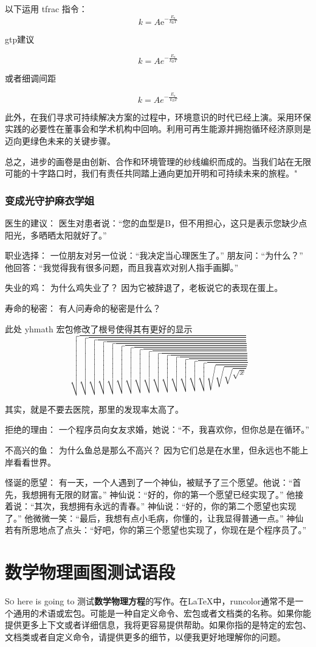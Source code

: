 \documentclass[12pt,a4paper]{article}
\begin{document}
		以下运用 tfrac 指令：
		$$
		k = A\mathrm{e}^{-\tfrac{E_a}{k_\mathrm{B}T}}
		$$
		
		gtp建议
		
		\[ k = A e^{-\frac{\scriptstyle E_a}{\scriptstyle k_B T}} \]
		
		
		或者细调间距
		
		\[ k = A e^{-\frac{\scriptstyle E_a}{\scriptstyle\, k_B T}} \]
		
		此外，在我们寻求可持续解决方案的过程中，环境意识的时代已经上演。采用环保实践的必要性在董事会和学术机构中回响。利用可再生能源并拥抱循环经济原则是迈向更绿色未来的关键步骤。
		
		总之，进步的画卷是由创新、合作和环境管理的纱线编织而成的。当我们站在无限可能的十字路口时，我们有责任共同踏上通向更加开明和可持续未来的旅程。"
	\subsubsection{变成光守护麻衣学姐}
	医生的建议：
	医生对患者说：“您的血型是B，但不用担心，这只是表示您缺少点阳光，多晒晒太阳就好了。”
	
	职业选择：
	一位朋友对另一位说：“我决定当心理医生了。”
	朋友问：“为什么？”
	他回答：“我觉得我有很多问题，而且我喜欢对别人指手画脚。”
	
	失业的鸡：
	为什么鸡失业了？
	因为它被辞退了，老板说它的表现在蛋上。
	
	寿命的秘密：
	有人问寿命的秘密是什么？
	
	此处 yhmath 宏包修改了根号使得其有更好的显示
	$$
	\sqrt{\sqrt{\sqrt{\sqrt{\sqrt{\sqrt{\sqrt{\sqrt{\sqrt{\sqrt{\sqrt{\sqrt{\sqrt{\sqrt{\sqrt{\sqrt{\sqrt{\sqrt{\sqrt{x}}}}}}}}}}}}}}}}}}}
	$$
	
	
	其实，就是不要去医院，那里的发现率太高了。
	
	拒绝的理由：
	一个程序员向女友求婚，她说：“不，我喜欢你，但你总是在循环。”
	
	不高兴的鱼：
	为什么鱼总是那么不高兴？
	因为它们总是在水里，但永远也不能上岸看看世界。
	
	怪诞的愿望：
	有一天，一个人遇到了一个神仙，被赋予了三个愿望。他说：“首先，我想拥有无限的财富。”
	神仙说：“好的，你的第一个愿望已经实现了。”
	他接着说：“其次，我想拥有永远的青春。”
	神仙说：“好的，你的第二个愿望也实现了。”
	他微微一笑：“最后，我想有点小毛病，你懂的，让我显得普通一点。”\textsuperscript{\cite{QLN2021}}
	神仙若有所思地点了点头：“好吧，你的第三个愿望也实现了，你现在是个程序员了。”\cite{PCD}
	\section{数学物理画图测试语段}
	\lettrine{S}{o} here is going to 测试\textbf{数学物理方程}的写作。在LaTeX中，runcolor通常不是一个通用的术语或宏包。可能是一种自定义命令、宏包或者文档类的名称。如果你能提供更多上下文或者详细信息，我将更容易提供帮助。如果你指的是特定的宏包、文档类或者自定义命令，请提供更多的细节，以便我更好地理解你的问题。
\end{document}
